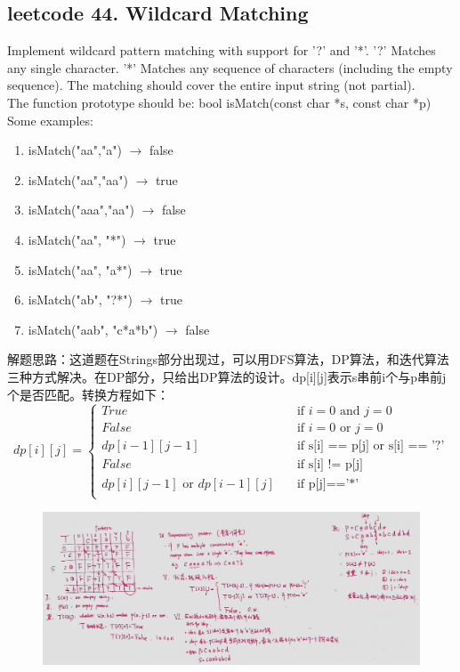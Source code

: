 \documentclass[a4paper,10pt]{article}
\begin{document}
\subsection{leetcode 44. Wildcard Matching}
Implement wildcard pattern matching with support for '?' and '*'. '?' Matches any single character. '*' Matches any sequence of characters (including the empty sequence). The matching should cover the entire input string (not partial).\\

\noindent The function prototype should be:
bool isMatch(const char *s, const char *p) \\

\noindent Some examples:
\begin{enumerate}
    \item isMatch("aa","a") $\to$ false
    \item isMatch("aa","aa") $\to$ true
    \item isMatch("aaa","aa") $\to$ false
    \item isMatch("aa", "*") $\to$ true
    \item isMatch("aa", "a*") $\to$ true
    \item isMatch("ab", "?*") $\to$ true
    \item isMatch("aab", "c*a*b") $\to$ false
\end{enumerate}

\begin{CJK*}{UTF8}{gbsn}
\noindent 解题思路：这道题在Strings部分出现过，可以用DFS算法，DP算法，和迭代算法三种方式解决。在DP部分，只给出DP算法的设计。dp[i][j]表示s串前i个与p串前j个是否匹配。转换方程如下：
        \[ dp[i][j] =
            \begin{cases}
                True        & \quad \text{if } i=0 \text{ and } j=0\\
                False       & \quad \text{if } i=0 \text{ or } j=0\\
                dp[i-1][j-1] & \quad \text{if s[i] == p[j] or s[i] == '?'}\\
                False       & \quad \text{if s[i] != p[j]}\\
                dp[i][j-1] \text{ or } dp[i-1][j]  & \quad \text{if p[j]=='*'}\\
            \end{cases}
        \]
\end{CJK*}

\begin{figure}[h]
\includegraphics[width=\textwidth]{leetcode44.jpg}
\centering
\end{figure}
\end{document}
